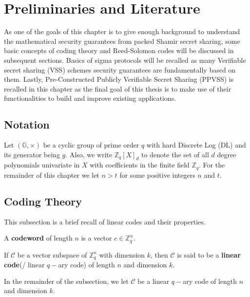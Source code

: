 \chapter{Preliminaries and Literature}
\label{chap:preliminaries}

As one of the goals of this chapter is to give enough background to understand the mathematical 
security guarantees from packed Shamir secret sharing, some basic concepts of coding theory 
and Reed-Solomon codes will be discussed in subsequent sections. Basics of sigma protocols 
will be recalled as many Verifiable secret sharing (VSS) schemes security guarantees 
are fundamentally based on them. Lastly, Pre-Constructed Publicly Verifiable Secret Sharing (PPVSS) 
is recalled in this chapter as the final goal of this thesis is to make use of their 
functionalities to build and improve existing applications.

\section{Notation}
Let $(\mathbb{G},\times)$ be a cyclic group of prime order $q$ with hard Discrete Log (DL) and its generator 
being $g$. 
Also, we write $\mathbb{Z}_{q}[X]_d$ to denote the set of all $d$ degree 
polynomials univariate in $X$ with coefficients in the finite field $\mathbb{Z}_q$. For the remainder of this 
chapter we let $n>t$ for some positive integers $n$ and $t$.

\section{Coding Theory}
\label{sec:linear-codes}
This subsection is a brief recall of linear codes and their properties.

\begin{definition}[Codeword]
  A \textbf{codeword} of length $n$ is a vector $c\in \mathbb{Z}_q^n$.
\end{definition}

\begin{definition}\cite{gallian2024contemporary}
  If $\mathcal{C}$ be a vector subspace of $\mathbb{Z}_q^n$ with dimension $k$, then $\mathcal{C}$ is 
  said to be a \textbf{linear code}(/ linear $q-$ary code) of length $n$ and dimension $k$.
\end{definition}

In the remainder of the subsection, we let $\mathcal{C}$ be a linear $q-$ary code of length $n$ and 
dimension $k$.

